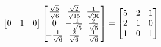 \begin{solution}
\begin{align*}
\begin{bmatrix}
0 & 1 & 0
\end{bmatrix}
\left[\begin{array}{@{\,}wc{13pt}wc{13pt}wc{13pt}@{\,}}
\frac{\sqrt{5}}{\sqrt{6}} & \frac{\sqrt{2}}{\sqrt{15}} & \frac{1}{\sqrt{30}} \\
0 & -\frac{1}{\sqrt{5}} & \frac{2}{\sqrt{5}} \\
-\frac{1}{\sqrt{6}} & \frac{2}{\sqrt{6}} & \frac{1}{\sqrt{6}}
\end{array}\right]
=
\begin{bmatrix}
5 & 2 & 1 \\
2 & 1 & 0 \\
1 & 0 & 1
\end{bmatrix} 
\end{align*}
\end{solution}

